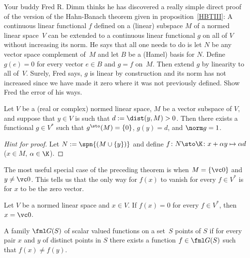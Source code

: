 \begin{exer} Your buddy Fred R. Dimm thinks he has discovered a really simple direct proof of
the version of the Hahn-Banach theorem given in proposition~\ref{HBTIII}: A continuous
linear functional $f$ defined on a (linear) subspace $M$ of a normed linear space~$V$ can
be extended to a continuous linear functional $g$ on all of $V$ without increasing
its norm. He says that all one needs to do is let $N$ be any vector space complement
of~$M$ and let $B$ be a (Hamel) basis for $N$.  Define $g(e) = 0$ for every vector $e
\in B$ and $g = f$ on~$M$. Then extend $g$ by linearity to all of~$V$. Surely,
Fred says, $g$ is linear by construction and its norm has not increased since we
have made it zero where it was not previously defined.  Show Fred the error of his ways.
\end{exer}

\begin{thm}\label{HBTIV} Let $V$ be a (real or complex) normed
linear space, $M$ be a vector subspace of $V$, and suppose that $y \in V$ is such that
$d := \dist(y,M) > 0$.  Then there exists a functional $g \in V^*$ such that $g^{\sto}(M) = \{0\}$,
$g(y) = d$, and $\norm g = 1$.
\end{thm}

\begin{proof}[\emph{Hint for proof}] Let $N := \spn{(M \cup \{y\})}$ and define
$f\colon N \sto \K \colon x + \alpha y \mapsto \alpha d$ ($x \in M$, $\alpha \in \K$). \ns
\end{proof}

The most useful special case of the preceding theorem is when $M = \{\vc 0\}$ and $y \ne \vc 0$.
This tells us that the only way for $f(x)$ to vanish for every $f \in V^*$ is for $x$ to
be the zero vector.

\begin{cor}\label{HBCorI} Let $V$ be a normed linear space and $x \in V$.  If $f(x) = 0$ for
every $f \in V^*$, then $x = \vc 0$.
\end{cor}

\begin{defn} A family $\fml G(S)$ of scalar valued functions on a set~$S$
 points of $S$ if for every pair $x$ and $y$ of distinct points in $S$ there exists
a function $f \in \fml G(S)$ such that $f(x) \ne f(y)$.
\end{defn}

